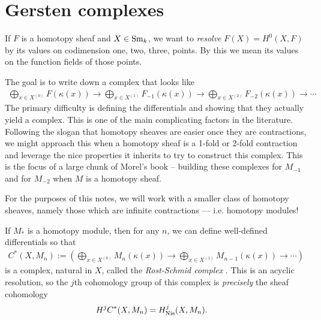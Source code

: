 \documentclass[11pt,openany]{book}
\begin{document}
\section{Gersten complexes}

If $F$ is a homotopy sheaf and $X\in \mathrm{Sm}_k$, we want to \textit{resolve} $F(X) = H^0(X,F)$ by its values on codimension one, two, three, points. By this we mean its values on the function fields of those points.

The goal is to write down a complex that looks like
\begin{align*}
    \bigoplus_{x\in X^{(0)}} F(\kappa(x)) \to \bigoplus_{x\in X^{(1)}} F_{-1}(\kappa(x)) \to \bigoplus_{x\in X^{(2)}} F_{-2}(\kappa(x)) \to \cdots 
\end{align*}
The primary difficulty is defining the differentials and showing that they actually yield a complex. This is one of the main complicating factors in the literature. Following the slogan that homotopy sheaves are easier once they are contractions, we might approach this when a homotopy sheaf is a 1-fold or 2-fold contraction and leverage the nice properties it inherits to try to construct this complex. This is the focus of a large chunk of Morel's book -- building these complexes for $M_{-1}$ and for $M_{-2}$ when $M$ is a homotopy sheaf.

For the purposes of this notes, we will work with a smaller class of homotopy sheaves, namely those which are infinite contractions --- i.e. homotopy modules!

\begin{theorem} If $M_\ast$ is a homotopy module, then for any $n$, we can define well-defined differentials so that
\begin{align*}
    C^\ast(X,M_n) := \left( \bigoplus_{x\in X^{(0)}} M_n(\kappa(x)) \to \bigoplus_{x\in X^{(1)}} M_{n-1}(\kappa(x)) \to \cdots \right)
\end{align*}
is a complex, natural in $X$, called the \textit{Rost-Schmid complex} \cite[5.31]{Morel}. This is an acyclic resolution, so the $j$th cohomology group of this complex is \textit{precisely} the sheaf cohomology
\begin{align*}
    H^j C^\ast(X,M_n) &= H^j_{\mathrm{Nis}}(X, M_n).
\end{align*}
\end{theorem}
\end{document}
